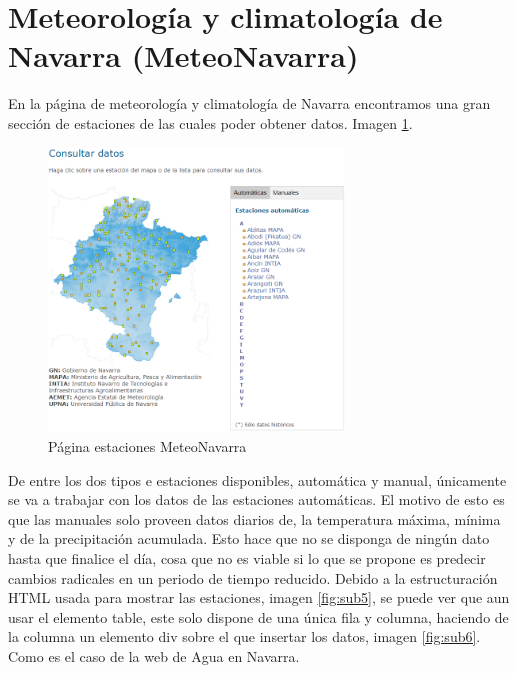 \section{Meteorología y climatología de Navarra (MeteoNavarra)}
En la página de meteorología y climatología de Navarra encontramos una gran sección de estaciones de las cuales poder obtener datos. Imagen \ref{fig:ej27}.

\begin{figure} [H]
	\centering
	\includegraphics[width=0.7\textwidth]{fig/MeteoNavarraCode.png}
	\caption[Página estaciones MeteoNavarra]{Página estaciones MeteoNavarra}
	\label{fig:ej27}
\end{figure}

De entre los dos tipos e estaciones disponibles, automática y manual, únicamente se va a trabajar con los datos de las estaciones automáticas. El motivo de esto es que las manuales solo proveen datos diarios de, la temperatura máxima, mínima y de la precipitación acumulada. Esto hace que no se disponga de ningún dato hasta que finalice el día, cosa que no es viable si lo que se propone es predecir cambios radicales en un periodo de tiempo reducido.
\newline
\newline
Debido a la estructuración HTML usada para mostrar las estaciones, imagen \ref{fig:sub5}, se puede ver que aun usar el elemento table, este solo dispone de una única fila y columna, haciendo de la columna un elemento div sobre el que insertar los datos, imagen \ref{fig:sub6}. Como es el caso de la web de Agua en Navarra.

